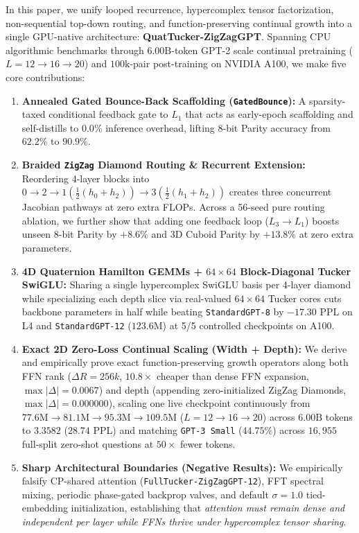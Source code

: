 \documentclass[10pt,twocolumn]{article}
\begin{document}
In this paper, we unify looped recurrence, hypercomplex tensor factorization, non-sequential top-down routing, and function-preserving continual growth into a single GPU-native architecture: \textbf{QuatTucker-ZigZagGPT}. Spanning CPU algorithmic benchmarks through $6.00\text{B}$-token GPT-2 scale continual pretraining ($L=12 \to 16 \to 20$) and $100\text{k}$-pair post-training on NVIDIA A100, we make five core contributions:
\begin{enumerate}
    \item \textbf{Annealed Gated Bounce-Back Scaffolding (\texttt{GatedBounce}):} A sparsity-taxed conditional feedback gate to $L_1$ that acts as early-epoch scaffolding and self-distills to $0.0\%$ inference overhead, lifting 8-bit Parity accuracy from $62.2\%$ to $90.9\%$.
    \item \textbf{Braided \texttt{ZigZag} Diamond Routing \& Recurrent Extension:} Reordering 4-layer blocks into $0 \to 2 \to 1(\tfrac{1}{2}(h_0+h_2)) \to 3(\tfrac{1}{2}(h_1+h_2))$ creates three concurrent Jacobian pathways at zero extra FLOPs. Across a 56-seed pure routing ablation, we further show that adding one feedback loop ($L_3 \to L_1$) boosts unseen 8-bit Parity by $+8.6\%$ and 3D Cuboid Parity by $+13.8\%$ at zero extra parameters.
    \item \textbf{4D Quaternion Hamilton GEMMs + $64 \times 64$ Block-Diagonal Tucker SwiGLU:} Sharing a single hypercomplex SwiGLU basis per 4-layer diamond while specializing each depth slice via real-valued $64 \times 64$ Tucker cores cuts backbone parameters in half while beating \texttt{StandardGPT-8} by $-17.30$ PPL on L4 and \texttt{StandardGPT-12} ($123.6\text{M}$) at 5/5 controlled checkpoints on A100.
    \item \textbf{Exact 2D Zero-Loss Continual Scaling (Width + Depth):} We derive and empirically prove exact function-preserving growth operators along both FFN rank ($\Delta R = 256k$, $10.8\times$ cheaper than dense FFN expansion, $\max|\Delta|=0.0067$) and depth (appending zero-initialized ZigZag Diamonds, $\max|\Delta|=0.000000$), scaling one live checkpoint continuously from $77.6\text{M} \to 81.1\text{M} \to 95.3\text{M} \to 109.5\text{M}$ ($L=12 \to 16 \to 20$) across $6.00\text{B}$ tokens to $3.3582$ ($28.74$ PPL) and matching \texttt{GPT-3 Small} ($44.75\%$) across $16{,}955$ full-split zero-shot questions at $50\times$ fewer tokens.
    \item \textbf{Sharp Architectural Boundaries (Negative Results):} We empirically falsify CP-shared attention (\texttt{FullTucker-ZigZagGPT-12}), FFT spectral mixing, periodic phase-gated backprop valves, and default $\sigma=1.0$ tied-embedding initialization, establishing that \emph{attention must remain dense and independent per layer while FFNs thrive under hypercomplex tensor sharing}.
\end{enumerate}
\end{document}
